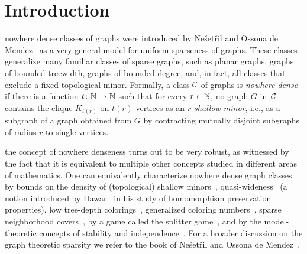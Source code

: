 \section{Introduction}\label{sec:intro}

 nowhere dense classes of graphs were introduced 
by Ne\v set\v ril and Ossona de 
Mendez~\cite{nevsetvril2008grad,nevsetvril2010first,nevsetvril2011nowhere} as a very 
general model
for uniform sparseness of graphs. These classes generalize many 
familiar classes of sparse graphs, such as planar graphs, graphs 
of bounded treewidth,  graphs of bounded degree, and, in fact, 
all classes that exclude a fixed 
topological minor.
Formally, a class $\mathcal{C}$ of graphs is {\em{nowhere dense}} if there is a function $t\colon \mathbb{N}\to \mathbb{N}$ such that for every $r\in \mathbb{N}$, no graph $G$ in~$\mathcal{C}$ contains the clique $K_{t(r)}$ on $t(r)$ vertices  as an {\em{$r$-shallow minor}},
i.e., as a subgraph of a graph obtained from $G$ by contracting mutually disjoint  subgraphs of radius $r$   to single vertices.


 the concept of nowhere denseness
turns out to be very robust, as witnessed by the fact that it is equivalent 
to multiple other concepts studied in different areas of mathematics. 
One can equivalently characterize nowhere dense graph classes 
by bounds on the density of (topological) shallow 
minors~\cite{nevsetvril2010first,nevsetvril2011nowhere},
quasi-wideness~\cite{nevsetvril2011nowhere} (a notion introduced by
Dawar~\cite{dawar2010homomorphism} in his study of homomorphism
preservation properties), low tree-depth
colorings~\cite{nevsetvril2008grad}, generalized coloring
numbers~\cite{zhu2009coloring}, sparse neighborhood
covers~\cite{GroheKRSS15,grohe2014deciding}, by a game called the
splitter game~\cite{grohe2014deciding}, and by the model-theoretic
concepts of stability and independence~\cite{adler2014interpreting}.
For a broader discussion on the graph theoretic sparsity we refer to the book
of Ne\v{s}et\v{r}il and Ossona de Mendez~\cite{sparsity}.

